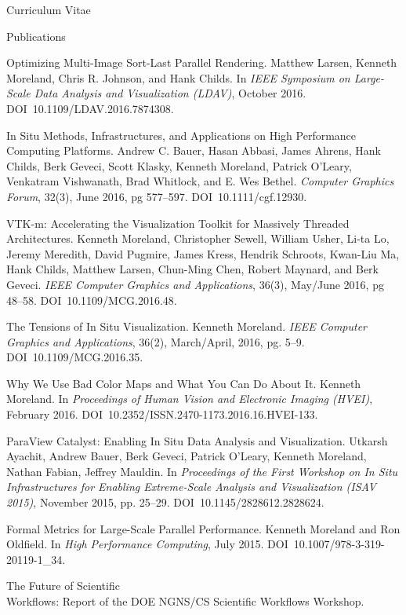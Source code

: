 \documentclass{article}
\begin{document}
\begin{cv}{Curriculum Vitae}
    \begin{cvlist}{Publications}
    \item[Optimizing Multi-Image Sort-Last Parallel Rendering.]
      Matthew Larsen, Kenneth Moreland, Chris R. Johnson, and Hank Childs.
      In \emph{IEEE Symposium on Large-Scale Data Analysis and Visualization (LDAV)}, October 2016.
      DOI~10.1109/LDAV.2016.7874308.
    \item[In Situ Methods, Infrastructures, and Applications on High Performance]~\\ Computing Platforms.
      Andrew C. Bauer, Hasan Abbasi, James Ahrens, Hank Childs, Berk Geveci, Scott Klasky, Kenneth Moreland, Patrick O'Leary, Venkatram Vishwanath, Brad Whitlock, and E. Wes Bethel.
      \emph{Computer Graphics Forum}, 32(3), June 2016, pg 577--597.
      DOI~10.1111/cgf.12930.
    \item[VTK-m: Accelerating the Visualization Toolkit for Massively Threaded]~\\ Architectures.
      Kenneth Moreland, Christopher Sewell, William Usher, Li-ta Lo, Jeremy Meredith, David Pugmire, James Kress, Hendrik Schroots, Kwan-Liu Ma, Hank Childs, Matthew Larsen, Chun-Ming Chen, Robert Maynard, and Berk Geveci.
      \emph{IEEE Computer Graphics and Applications}, 36(3), May/June 2016, pg 48--58.
      DOI~10.1109/MCG.2016.48.
    \item[The Tensions of In Situ Visualization.]
      Kenneth Moreland.
      \emph{IEEE Computer Graphics and Applications}, 36(2), March/April, 2016, pg. 5--9.
      DOI~10.1109/MCG.2016.35.
    \item[Why We Use Bad Color Maps and What You Can Do About It.]
      Kenneth Moreland.
      In \emph{Proceedings of Human Vision and Electronic Imaging (HVEI)}, February 2016.
      DOI~10.2352/ISSN.2470-1173.2016.16.HVEI-133.
    \item[ParaView Catalyst: Enabling In Situ Data Analysis and Visualization.]
      Utkarsh Ayachit, Andrew Bauer, Berk Geveci, Patrick O'Leary, Kenneth Moreland, Nathan Fabian, Jeffrey Mauldin.
      In \emph{Proceedings of the First Workshop on In Situ Infrastructures for Enabling Extreme-Scale Analysis and Visualization (ISAV 2015)}, November 2015, pp. 25--29.
      DOI~10.1145/2828612.2828624.
    \item[Formal Metrics for Large-Scale Parallel Performance.]
      Kenneth Moreland and Ron Oldfield.
      In \emph{High Performance Computing}, July 2015.
      DOI~10.1007/978-3-319-20119-1\_34.
    \item[The Future of Scientific]~\\ Workflows: Report of the DOE NGNS/CS Scientific Workflows Workshop.

\end{cvlist}
\end{cv}
\end{document}
